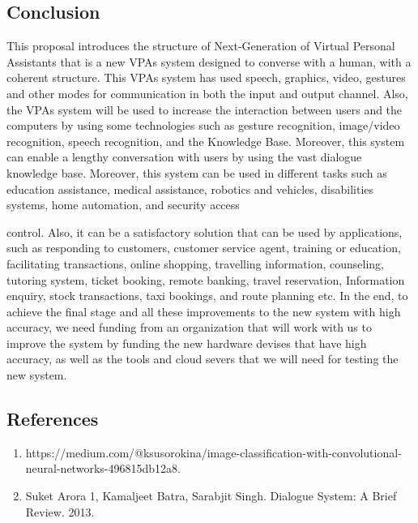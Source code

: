 \documentclass[12pt,a4paper]{article}
\begin{document}
\begin{center}
\section{Conclusion}
\end{center}
This proposal introduces the structure of Next-Generation
of Virtual Personal Assistants that is a new VPAs system
designed to converse with a human, with a coherent structure.
This VPAs system has used speech, graphics, video, gestures
and other modes for communication in both the input and
output channel. Also, the VPAs system will be used to increase
the interaction between users and the computers by using some
technologies such as gesture recognition, image/video
recognition, speech recognition, and the Knowledge Base.
Moreover, this system can enable a lengthy conversation with
users by using the vast dialogue knowledge base. Moreover,
this system can be used in different tasks such as education
assistance, medical assistance, robotics and vehicles,
disabilities systems, home automation, and security access
\par
control. Also, it can be a satisfactory solution that can be used
by applications, such as responding to customers, customer
service agent, training or education, facilitating transactions,
online shopping, travelling information, counseling, tutoring
system, ticket booking, remote banking, travel reservation,
Information enquiry, stock transactions, taxi bookings, and
route planning etc. In the end, to achieve the final stage and all
these improvements to the new system with high accuracy, we
need funding from an organization that will work with us to
improve the system by funding the new hardware devises that
have high accuracy, as well as the tools and cloud severs that
we will need for testing the new system.

\newpage

\begin{center}
\section{References}
\end{center}
\begin{enumerate}
\item https://medium.com/@ksusorokina/image-classification-with-convolutional-neural-networks-496815db12a8.
\item Suket Arora 1, Kamaljeet Batra, Sarabjit Singh. Dialogue System: A Brief Review. 2013.

\end{enumerate}
\end{document}
